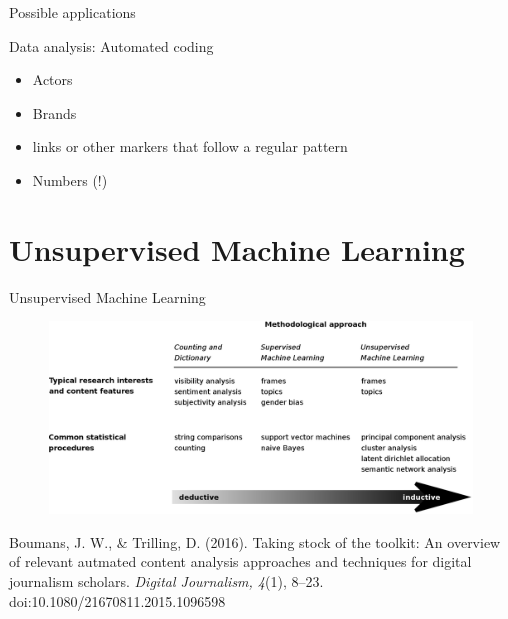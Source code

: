 \documentclass{beamer}
\begin{document}
\begin{frame}{Possible applications}
\begin{block}{Data analysis: Automated coding}
\begin{itemize}
\item Actors
\item Brands
\item links or other markers that follow a regular pattern
\item Numbers (!)
\end{itemize}
\end{block}
\end{frame}




\section{Unsupervised Machine Learning}

\begin{frame}
	Unsupervised Machine Learning
\end{frame}



\begin{frame}[plain]
	\begin{figure}
		\centering
		\includegraphics[width=1.0\linewidth]{boumanstrilling2016}
		\label{fig:boumanstrilling2016}
	\end{figure}
	\tiny{Boumans, J. W., \& Trilling, D. (2016). Taking stock of the toolkit: An overview of relevant autmated content analysis approaches and techniques for digital journalism scholars. \emph{Digital Journalism, 4}(1), 8–23. doi:10.1080/21670811.2015.1096598}
\end{frame}
\end{document}
